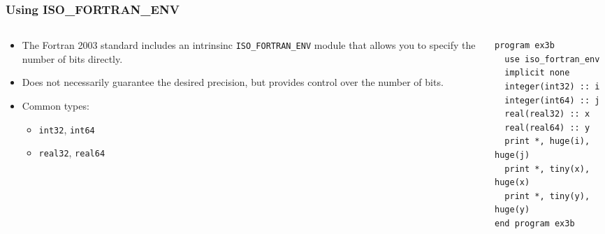 \documentclass[10pt,aspectratio=169]{beamer}
\begin{document}
\begin{frame}[fragile]
  \frametitle{Using ISO\_FORTRAN\_ENV}
  \begin{columns}[T]
    \begin{column}{0.5\textwidth}
      \begin{itemize}
      \item The Fortran 2003 standard includes an intrinsinc \texttt{ISO\_FORTRAN\_ENV} module that allows you to specify the number of bits directly.
        \item Does not necessarily guarantee the desired precision, but provides control over the number of bits.
        \item Common types:
          \begin{itemize}
            \item \texttt{int32}, \texttt{int64}
            \item \texttt{real32}, \texttt{real64}
          \end{itemize}
      \end{itemize}
    \end{column}

    \begin{column}{0.5\textwidth}
      \begin{lstlisting}
program ex3b
  use iso_fortran_env
  implicit none
  integer(int32) :: i
  integer(int64) :: j
  real(real32) :: x
  real(real64) :: y
  print *, huge(i), huge(j)
  print *, tiny(x), huge(x)
  print *, tiny(y), huge(y)
end program ex3b
      \end{lstlisting}
    \end{column}
  \end{columns}
\end{frame}
\end{document}
